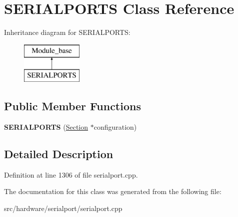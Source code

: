 \hypertarget{classSERIALPORTS}{\section{S\-E\-R\-I\-A\-L\-P\-O\-R\-T\-S Class Reference}
\label{classSERIALPORTS}
}
Inheritance diagram for S\-E\-R\-I\-A\-L\-P\-O\-R\-T\-S\-:\begin{figure}[H]
\begin{center}
\leavevmode
\includegraphics[height=2.000000cm]{classSERIALPORTS}
\end{center}
\end{figure}
\subsection*{Public Member Functions}
\begin{DoxyCompactItemize}
\item 
\hypertarget{classSERIALPORTS_a36570726a1e10f60d8d7be830141f465}{{\bfseries S\-E\-R\-I\-A\-L\-P\-O\-R\-T\-S} (\hyperlink{classSection}{Section} $\ast$configuration)}\label{classSERIALPORTS_a36570726a1e10f60d8d7be830141f465}

\end{DoxyCompactItemize}


\subsection{Detailed Description}


Definition at line 1306 of file serialport.\-cpp.



The documentation for this class was generated from the following file\-:\begin{DoxyCompactItemize}
\item 
src/hardware/serialport/serialport.\-cpp\end{DoxyCompactItemize}
